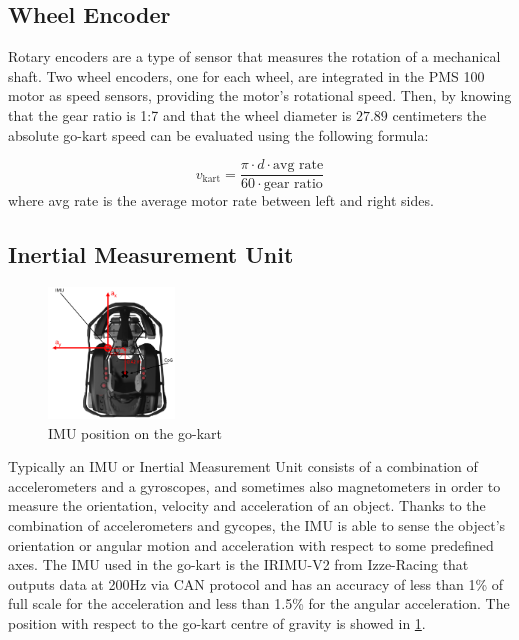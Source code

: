 \documentclass[a4paper,12pt,oneside]{book}
\begin{document}
\subsection*{Wheel Encoder}
Rotary encoders are a type of sensor that measures the rotation of a mechanical shaft.
Two wheel encoders, one for each wheel, are integrated in the PMS 100 motor as speed sensors, providing the motor's rotational speed.
Then, by knowing that the gear ratio is 1:7 and that the wheel diameter is $27.89$ centimeters the absolute go-kart speed can be evaluated using the following formula:

\begin{equation}
    v_{\text{kart}} = \frac{\pi \cdot d \cdot \text{avg rate}}{60 \cdot \text{gear ratio}}
\end{equation}
where avg rate is the average motor rate between left and right sides.



\subsection*{Inertial Measurement Unit}

\begin{figure}[h!]
	\centering
	\includegraphics[width=0.3\textwidth]{IMU.png}
\caption{IMU position on the go-kart}
\label{IMU_pose}
\end{figure}

Typically an IMU or Inertial Measurement Unit consists of a combination of accelerometers and a gyroscopes, and sometimes also magnetometers in order to measure the orientation, velocity and acceleration of an object.
Thanks to the combination of accelerometers and gycopes, the IMU is able to sense the object's orientation or angular motion and acceleration with respect to some predefined axes.
The IMU used in the go-kart is the IRIMU-V2 from Izze-Racing that outputs data at 200Hz via CAN protocol and has an accuracy of less than 1\% of full scale for the acceleration and less than 1.5\% for the angular acceleration.
The position with respect to the go-kart centre of gravity is showed in \ref{IMU_pose}.
\end{document}
